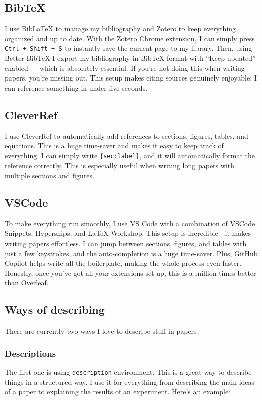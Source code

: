 \subsection*{BibTeX}

I use BibLaTeX to manage my bibliography and Zotero to keep everything organized and up to date. With the Zotero Chrome extension, I can simply press \texttt{Ctrl + Shift + S} to instantly save the current page to my library. Then, using Better BibTeX I export my bibliography in BibTeX format with \enquote{Keep updated} enabled --- which is absolutely essential. If you're not doing this when writing papers, you're missing out. This setup makes citing sources genuinely enjoyable: I can reference something in under five seconds.

\subsection*{CleverRef}
I use CleverRef to automatically add references to sections, figures, tables, and equations. This is a huge time-saver and makes it easy to keep track of everything. I can simply write \texttt{\string\Cref\{sec:label\}}, and it will automatically format the reference correctly. This is especially useful when writing long papers with multiple sections and figures.

\subsection*{VSCode}
To make everything run smoothly, I use VS Code with a combination of VSCode Snippets, Hypersnips, and LaTeX Workshop. This setup is incredible—it makes writing papers effortless. I can jump between sections, figures, and tables with just a few keystrokes, and the auto-completion is a huge time-saver. Plus, GitHub Copilot helps write all the boilerplate, making the whole process even faster. Honestly, once you've got all your extensions set up, this is a million times better than Overleaf.


\subsection*{Ways of describing}
There are currently two ways I love to describe stuff in papers.
\subsubsection*{Descriptions}
The first one is using \texttt{description} environment. This is a great way to describe things in a structured way. I use it for everything from describing the main ideas of a paper to explaining the results of an experiment. Here's an example:

